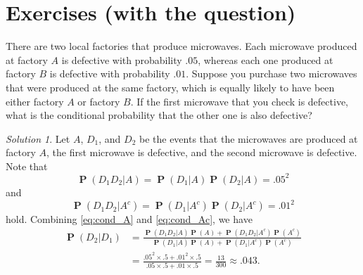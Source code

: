 \documentclass{amsart}
\theoremstyle{definition}
\newenvironment{exercise}[1]
	{\renewcommand\theinnerexercise{#1}\innerexercise}
	{\endinnerexercise}
\theoremstyle{remark}
\newtheorem*{solution}{Solution}
\DeclareMathOperator{\PP}{\mathbf{P}}
\begin{document}
\section{Exercises (with the question)}

\begin{exercise}{27}
There are two local factories that produce microwaves.
Each microwave produced at factory $A$ is defective with probability $.05$,
whereas each one produced at factory $B$ is defective with probability $.01$.
Suppose you purchase two microwaves that were produced at the same factory,
which is equally likely to have been either factory $A$ or factory $B$.
If the first microwave that you check is defective, what is the conditional
probability that the other one is also defective?
\end{exercise}

\begin{solution}
Let $A$, $D_1$, and $D_2$ be the events that the microwaves are produced at factory $A$, the first microwave is defective, and the second microwave
is defective.
Note that
\begin{equation} \label{eq:cond_A}
\PP(D_1D_2|A) = \PP(D_1|A)\PP(D_2|A) = .05^2
\end{equation}
and
\begin{equation} \label{eq:cond_Ac}
\PP(D_1D_2|A^c) = \PP(D_1|A^c)\PP(D_2|A^c) = .01^2
\end{equation}
hold. Combining \eqref{eq:cond_A} and \eqref{eq:cond_Ac}, we have
\[
\begin{split}
\PP(D_2|D_1) &= \frac{\PP(D_1D_2|A)\PP(A) + \PP(D_1D_2|A^c)\PP(A^c)}{
\PP(D_1|A)\PP(A) + \PP(D_1|A^c)\PP(A^c)} \\
&= \frac{.05^2 \times .5 + .01^2 \times .5}{.05 \times .5 + .01 \times .5}
= \frac{13}{300} \approx .043.
\end{split}
\]
\end{solution}
\end{document}
